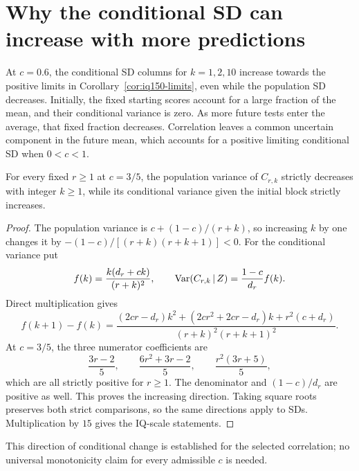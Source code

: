 \section{Why the conditional SD can increase with more predictions}
At \(c=0.6\), the conditional SD columns for \(k=1,2,10\) increase
towards the positive limits in Corollary~\ref{cor:iq150-limits}, even
while the population SD decreases. Initially, the fixed starting scores
account for a large fraction of the mean, and their conditional variance
is zero. As more future tests enter the average, that fixed fraction
decreases. Correlation leaves a common uncertain component in the future
mean, which accounts for a positive limiting conditional SD when
\(0<c<1\).

\begin{proposition}
\label{prop:conditional-sd-growth-examples}
For every fixed \(r\geq1\) at \(c=3/5\), the population variance of
\(C_{r,k}\) strictly decreases with integer \(k\geq1\), while its
conditional variance given the initial block strictly increases.
\end{proposition}
\begin{proof}
The population variance is \(c+(1-c)/(r+k)\), so increasing \(k\) by
one changes it by
\(- (1-c)/[(r+k)(r+k+1)]<0\).
For the conditional variance put
\[
 f(k)=\frac{k(d_r+ck)}{(r+k)^2},\qquad
 \operatorname{Var}(C_{r,k}\,\vert\, Z)=\frac{1-c}{d_r}f(k).
\]
Direct multiplication gives
\[
 f(k+1)-f(k)
 =\frac{(2cr-d_r)k^2+(2cr^2+2cr-d_r)k+r^2(c+d_r)}
        {(r+k)^2(r+k+1)^2}.
\]
At \(c=3/5\), the three numerator coefficients are
\[
 \frac{3r-2}{5},\qquad
 \frac{6r^2+3r-2}{5},\qquad
 \frac{r^2(3r+5)}{5},
\]
which are all strictly positive for \(r\geq1\). The denominator and
\((1-c)/d_r\) are positive as well. This proves the increasing direction.
Taking square roots preserves both strict comparisons, so the same
directions apply to SDs. Multiplication by \(15\) gives the IQ-scale
statements.
\end{proof}
This direction of conditional change is established for the selected
correlation; no universal monotonicity claim for every admissible \(c\)
is needed.

